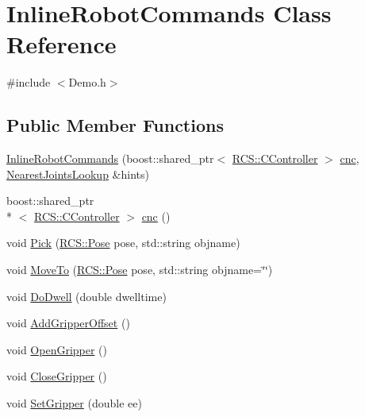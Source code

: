\hypertarget{classInlineRobotCommands}{\section{Inline\-Robot\-Commands Class Reference}
\label{classInlineRobotCommands}
}


{\ttfamily \#include $<$Demo.\-h$>$}

\subsection*{Public Member Functions}
\begin{DoxyCompactItemize}
\item 
\hyperlink{classInlineRobotCommands_a55f98544e6640f051b32f3fa46b910ce}{Inline\-Robot\-Commands} (boost\-::shared\-\_\-ptr$<$ \hyperlink{structRCS_1_1CController}{R\-C\-S\-::\-C\-Controller} $>$ \hyperlink{classInlineRobotCommands_a8bbcf09003802157c790e6259c7ff266}{cnc}, \hyperlink{classNearestJointsLookup}{Nearest\-Joints\-Lookup} \&hints)
\item 
boost\-::shared\-\_\-ptr\\*
$<$ \hyperlink{structRCS_1_1CController}{R\-C\-S\-::\-C\-Controller} $>$ \hyperlink{classInlineRobotCommands_a8bbcf09003802157c790e6259c7ff266}{cnc} ()
\item 
void \hyperlink{classInlineRobotCommands_a1f29c0424d9c98c01691ddfe521383a3}{Pick} (\hyperlink{namespaceRCS_aa07e45d8a50e30064283d2b38087f999}{R\-C\-S\-::\-Pose} pose, std\-::string objname)
\item 
void \hyperlink{classInlineRobotCommands_ae38c59374bd43f0487f497ed5f075a4f}{Move\-To} (\hyperlink{namespaceRCS_aa07e45d8a50e30064283d2b38087f999}{R\-C\-S\-::\-Pose} pose, std\-::string objname=\char`\"{}\char`\"{})
\item 
void \hyperlink{classInlineRobotCommands_a09d5b54783e9170d2cc38bccd5e9f68e}{Do\-Dwell} (double dwelltime)
\item 
void \hyperlink{classInlineRobotCommands_adf938bd806e814533d0e8da269f9c9ae}{Add\-Gripper\-Offset} ()
\item 
void \hyperlink{classInlineRobotCommands_a4d534f48643fe9eb9c9092113b4ae388}{Open\-Gripper} ()
\item 
void \hyperlink{classInlineRobotCommands_aba001f2c6b02d413ce81925946bfd46d}{Close\-Gripper} ()
\item 
void \hyperlink{classInlineRobotCommands_a7c03908c20b1278c65c0d33bfeb66a87}{Set\-Gripper} (double ee)

\end{DoxyCompactItemize}
